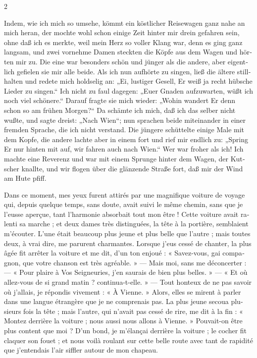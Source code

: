 \documentclass[a4paper,11pt]{article}
\newcommand\chunks[2]{%
\begin{leftcolumn*}\begin{otherlanguage}{german}%
{#1}%
\end{otherlanguage}\end{leftcolumn*}%
\begin{rightcolumn}\begin{otherlanguage}{french}%
{#2}%
\end{otherlanguage}\end{rightcolumn}%
}
\begin{document}
\begin{paracol}{2}
  \chunks{Indem, wie ich mich so umsehe, kömmt ein köstlicher Reisewagen ganz nahe an mich heran, der mochte wohl schon einige Zeit hinter mir drein gefahren sein, ohne daß ich es merkte, weil mein Herz so voller Klang war, denn es ging ganz langsam, und zwei vornehme Damen steckten die Köpfe aus dem Wagen und hörten mir zu. Die eine war besonders schön und jünger als die andere, aber eigentlich gefielen sie mir alle beide. Als ich nun aufhörte zu singen, ließ die ältere stillhalten und redete mich holdselig an: „Ei, lustiger Gesell, Er weiß ja recht hübsche Lieder zu singen.“ Ich nicht zu faul dagegen: „Euer Gnaden aufzuwarten, wüßt ich noch viel schönere.“ Darauf fragte sie mich wieder: „Wohin wandert Er denn schon so am frühen Morgen?“ Da schämte ich mich, daß ich das selber nicht wußte, und sagte dreist: „Nach Wien“; nun sprachen beide miteinander in einer fremden Sprache, die ich nicht verstand. Die jüngere schüttelte einige Male mit dem Kopfe, die andere lachte aber in einem fort und rief mir endlich zu: „Spring Er nur hinten mit auf, wir fahren auch nach Wien.“ Wer war froher als ich! Ich machte eine Reverenz und war mit einem Sprunge hinter dem Wagen, der Kutscher knallte, und wir flogen über die glänzende Straße fort, daß mir der Wind am Hute pfiff.}
         {Dans ce moment, mes yeux furent attirés par une magnifique voiture de voyage qui, depuis quelque temps, sans doute, avait suivi le même chemin, sans que je l’eusse aperçue, tant l’harmonie absorbait tout mon être ! Cette voiture avait ralenti sa marche ; et deux dames très distinguées, la tête à la portière, semblaient m’écouter. L’une était beaucoup plus jeune et plus belle que l’autre ; mais toutes deux, à vrai dire, me parurent charmantes. Lorsque j’eus cessé de chanter, la plus âgée fit arrêter la voiture et me dit, d’un ton enjoué : « Savez-vous, gai compagnon, que votre chanson est très agréable. » --- Mais moi, sans me déconcerter : --- « Pour plaire à Vos Seigneuries, j’en saurais de bien plus belles. » --- « Et où allez-vous de si grand matin ? continua-t-elle. » --- Tout honteux de ne pas savoir où j’allais, je répondis vivement : « À Vienne. » Alors, elles se mirent à parler dans une langue étrangère que je ne comprenais pas. La plus jeune secoua plusieurs fois la tête ; mais l’autre, qui n’avait pas cessé de rire, me dit à la fin : « Montez derrière la voiture ; nous aussi nous allons à Vienne. » Pouvait-on être plus content que moi ? D’un bond, je m’élançai derrière la voiture ; le cocher fit claquer son fouet ; et nous voilà roulant sur cette belle route avec tant de rapidité que j’entendais l’air siffler autour de mon chapeau.}

\end{paracol}
\end{document}
